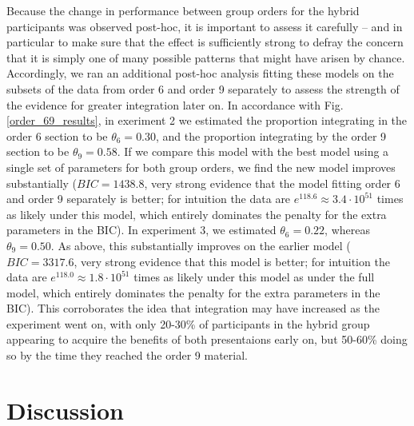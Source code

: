 \documentclass[man,mask,10pt]{apa6}
\begin{document}
Because the change in performance between group orders for the hybrid participants was observed post-hoc, it is important to assess it carefully -- and in particular to make sure that the effect is sufficiently strong to defray the concern that it is simply one of many possible patterns that might have arisen by chance. Accordingly, we ran an additional post-hoc analysis fitting these models on the subsets of the data from order 6 and order 9 separately to assess the strength of the evidence for greater integration later on. In accordance with Fig. \ref{order_69_results}, in exeriment 2 we estimated the proportion integrating in the order 6 section to be $\theta_6 = 0.30$, and the proportion integrating by the order 9 section to be $\theta_9 = 0.58$. If we compare this model with the best model using a single set of parameters for both group orders, we find the new model improves substantially ($BIC = 1438.8$, very strong evidence that the model fitting order 6 and order 9 separately is better; for intuition the data are $e^{118.6} \approx 3.4 \cdot 10^{51}$ times as likely under this model, which entirely dominates the penalty for the extra parameters in the BIC). In experiment 3, we estimated $\theta_6 = 0.22$, whereas $\theta_9 = 0.50$. As above, this substantially improves on the earlier model ($BIC=3317.6$, very strong evidence that this model is better; for intuition the data are $e^{118.0} \approx 1.8 \cdot 10^{51}$ times as likely under this model as under the full model, which entirely dominates the penalty for the extra parameters in the BIC). This corroborates the idea that integration may have increased as the experiment went on, with only 20-30\% of participants in the hybrid group appearing to acquire the benefits of both presentaions early on, but 50-60\% doing so by the time they reached the order 9 material.
\section{Discussion}
\end{document}

